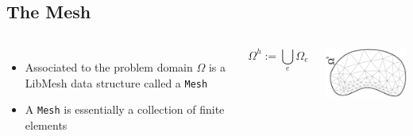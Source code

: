 \subsection*{The Mesh}
\begin{frame}[t]
  \begin{columns}[t]
      \begin{itemize}
      \item{
	Associated to the problem domain $\Omega$ is a LibMesh data
	structure called a \texttt{Mesh}
      }
	
      \item{A \texttt{Mesh} is essentially
	a collection of finite elements}
      \end{itemize}
      \begin{equation}
	\label{eqn:discretized_domain}
	\nonumber
	\Omega^h:=\bigcup_e \Omega_e
      \end{equation}
      \begin{center}
	\includegraphics[width=2in,angle=-90]{figures/discretized_domain}
      \end{center}
  \end{columns}
\end{frame}


